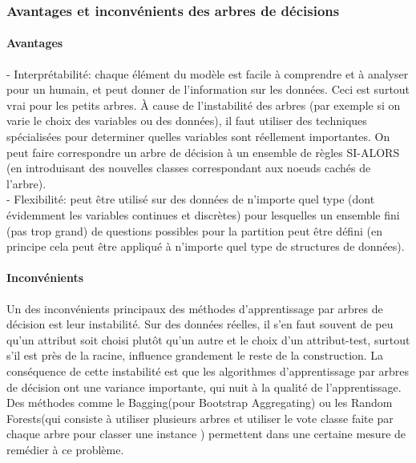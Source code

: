 \subsubsection{Avantages et inconvénients des arbres de décisions}
\paragraph{Avantages}
- Interprétabilité: chaque élément du modèle est facile à comprendre et à analyser pour un humain, et peut donner de l'information sur les données. Ceci est surtout vrai pour les petits arbres. À cause de l'instabilité des arbres (par exemple si on varie le choix des variables ou des données), il faut utiliser des techniques spécialisées pour determiner quelles variables sont réellement importantes. On peut faire correspondre un arbre de décision à un ensemble de règles SI-ALORS (en introduisant des nouvelles classes correspondant aux noeuds cachés de l'arbre).\\
- Flexibilité: peut être utilisé sur des données de n'importe quel type (dont évidemment les variables continues et discrètes) pour lesquelles un ensemble fini (pas trop grand) de questions possibles pour la partition peut être défini (en principe cela peut être appliqué à n'importe quel type de structures de données). \\
\paragraph{Inconvénients }

Un des inconvénients principaux des méthodes d'apprentissage par arbres de décision
est leur instabilité. Sur des données réelles, il s’en faut souvent de peu qu'un attribut soit
choisi plutôt qu'un autre et le choix d’un attribut-test, surtout s’il est près de la racine,
influence grandement le reste de la construction. La conséquence de cette instabilité
est que les algorithmes d'apprentissage par arbres de décision ont une variance importante, qui nuit à la qualité de l'apprentissage. Des méthodes comme le Bagging(pour Bootstrap Aggregating) ou les Random Forests(qui consiste à utiliser plusieurs arbres et utiliser le vote classe faite par chaque arbre pour classer une instance ) \cite{RandomForrest1} permettent dans une certaine mesure de remédier à ce problème.
